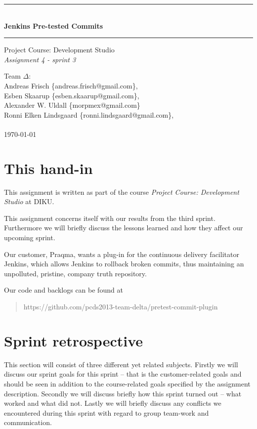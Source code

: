 \documentclass[a4paper,11pt]{article}
\makeatletter
\newcommand{\systemname}{Jenkins Pre-tested Commits}
\newcommand{\groupname}{Team $\Delta$}
\newcommand{\groupmembers}{
	Andreas Frisch \{andreas.frisch@gmail.com\}, \\
	Esben Skaarup \{esben.skaarup@gmail.com\}, \\
	Alexander W. Uldall \{morpmex@gmail.com\} \\
	Ronni Elken Lindsgaard \{ronni.lindsgaard@gmail.com\}, \\
	~
}
\makeatother
\begin{document}
\begin{titlepage}
	\begin{center}
		\vspace*{4cm}
		\rule{\linewidth}{0.5mm}\\[0.4cm]
		{\huge \bfseries \systemname}
		\rule{\linewidth}{0.5mm}
	\end{center}
	\begin{flushleft}
		{
			\Large Project Course: Development Studio \\[0.1cm]
			{\it Assignment 4 - sprint 3}
		}
	\end{flushleft}
	\vspace*{4cm}
	
	\begin{flushleft}
		{\Large \groupname :} \\[0.1cm]
		{\Large \groupmembers} \\[0.3cm]
		{\Large \today}
	\end{flushleft}
\end{titlepage}
\newpage
\onehalfspacing
\setcounter{tocdepth}{2}

\section{This hand-in}
This assignment is written as part of the course {\it Project Course: Development Studio} at DIKU.

This assignment concerns itself with our results from the third sprint.
Furthermore we will briefly discuss the lessons learned and how they affect our
upcoming sprint.

Our customer, Praqma, wants a plug-in for the continuous delivery facilitator
Jenkins, which allows Jenkins to rollback broken commits, thus maintaining an
unpolluted, pristine, company truth repository.

Our code and backlogs can be found at
\begin{quote}
	https://github.com/pcds2013-team-delta/pretest-commit-plugin
\end{quote}

\section{Sprint retrospective}
\label{sec:sprint_retrospective}
This section will consist of three different yet related subjects. Firstly we
will discuss our sprint goals for this sprint -- that is the customer-related
goals and should be seen in addition to the course-related goals specified by
the assignment description. Secondly we will discuss briefly how this sprint
turned out -- what worked and what did not. Lastly we will briefly discuss any
conflicts we encountered during this sprint with regard to group team-work and
communication.
\end{document}
